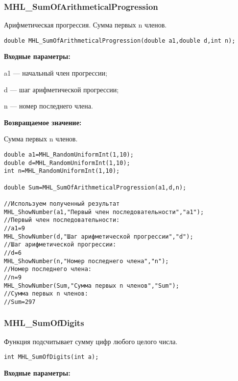 \documentclass[a4paper,12pt]{article}
\begin{document}
\subsubsection{MHL\_SumOfArithmeticalProgression}\label{MHL_SumOfArithmeticalProgression}

Арифметическая прогрессия. Сумма первых n членов.


\begin{lstlisting}[label=code_syntax_MHL_SumOfArithmeticalProgression,caption=Синтаксис]
double MHL_SumOfArithmeticalProgression(double a1,double d,int n);
\end{lstlisting}

\textbf{Входные параметры:}  
 
 a1 --- начальный член прогрессии;
 
 d --- шаг арифметической прогрессии;
 
 n --- номер последнего члена.

\textbf{Возвращаемое значение:}
 
Сумма первых n членов.


\begin{lstlisting}[label=code_use_MHL_SumOfArithmeticalProgression,caption=Пример использования]
double a1=MHL_RandomUniformInt(1,10);
double d=MHL_RandomUniformInt(1,10);
int n=MHL_RandomUniformInt(1,10);

double Sum=MHL_SumOfArithmeticalProgression(a1,d,n);

//Используем полученный результат
MHL_ShowNumber(a1,"Первый член последовательности","a1");
//Первый член последовательности:
//a1=9
MHL_ShowNumber(d,"Шаг арифметической прогрессии","d");
//Шаг арифметической прогрессии:
//d=6
MHL_ShowNumber(n,"Номер последнего члена","n");
//Номер последнего члена:
//n=9
MHL_ShowNumber(Sum,"Сумма первых n членов","Sum");
//Сумма первых n членов:
//Sum=297
\end{lstlisting}

\subsubsection{MHL\_SumOfDigits}\label{MHL_SumOfDigits}

Функция подсчитывает сумму цифр любого целого числа.


\begin{lstlisting}[label=code_syntax_MHL_SumOfDigits,caption=Синтаксис]
int MHL_SumOfDigits(int a);
\end{lstlisting}

\textbf{Входные параметры:}
\end{document}
